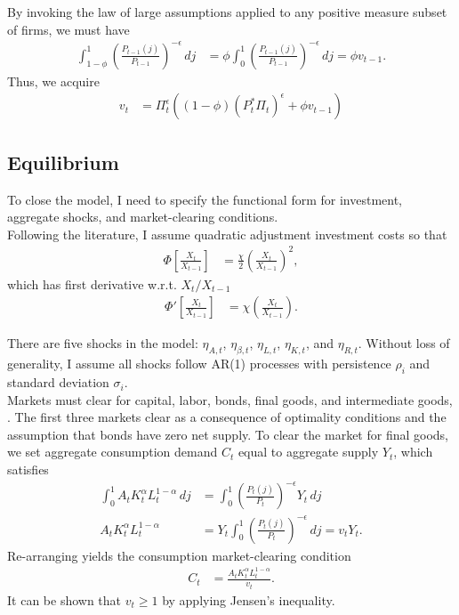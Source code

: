 \documentclass[12 pt, oneside]{article}
\theoremstyle{definition}
\theoremstyle{definition}
\theoremstyle{definition}
\begin{document}
By invoking the law of large assumptions applied to any positive measure subset of firms, we must have
\begin{align*}
  \int_{1 - \phi}^1 \left(\frac{P_{t - 1}(j)}{P_{t - 1}}\right)^{ - \epsilon}\,dj & = \phi\int_0^1 \left(\frac{P_{t - 1}(j)}{P_{t - 1}}\right)^{ - \epsilon}\,dj = \phi v_{t - 1}.
\end{align*}
Thus, we acquire
\begin{align}\label{eq:price dispersion evol}
  v_t & = \Pi_t^{\epsilon}((1 - \phi) (P_t^* \Pi_t)^{\epsilon} + \phi v_{t - 1})
\end{align}


\subsection{Equilibrium}
To close the model, I need to specify the functional form for investment, aggregate shocks, and market-clearing conditions.\\

Following the literature, I assume quadratic adjustment investment costs so that
\begin{align}\label{eq:invst adjst cost fnct}
  \Phi\left[\frac{X_t}{X_{t - 1}}\right] & = \frac{\chi}{2}\left(\frac{X_t}{X_{t - 1}}\right)^2,
\end{align}
which has first derivative w.r.t. $X_t / X_{t - 1}$
\begin{align}\label{eq:invst adjst cost fnct first deriv}
    \Phi'\left[\frac{X_t}{X_{t - 1}}\right] & = \chi\left(\frac{X_t}{X_{t - 1}}\right).
\end{align}

There are five shocks in the model: $\eta_{A, t}$, $\eta_{\beta, t}$, $\eta_{L, t}$, $\eta_{K, t}$, and $\eta_{R, t}$. Without loss of generality, I assume all shocks follow AR(1) processes with persistence $\rho_i$ and standard deviation $\sigma_i$.\\

Markets must clear for capital, labor, bonds, final goods, and intermediate goods, . The first three markets clear as a consequence of optimality conditions and the assumption that bonds have zero net supply. To clear the market for final goods, we set aggregate consumption demand $C_t$ equal to aggregate supply $Y_t$, which satisfies
\begin{align*}
\int_0^1 A_t K_t^\alpha L_t^{1 - \alpha}\, dj & = \int_0^1\left(\frac{P_t(j)}{P_t}\right)^{-\epsilon} Y_t\, dj\\
  A_tK_t^\alpha L_t^{1 - \alpha} & = Y_t \int_0^1\left(\frac{P_t(j)}{P_t}\right)^{-\epsilon} \, dj = v_t Y_t.
\end{align*}
Re-arranging yields the consumption market-clearing condition
\begin{align}\label{eq:consumption market clearing}
  C_t & = \frac{A_t K_t^{\alpha}L_t^{1 - \alpha}}{v_t}.
\end{align}
It can be shown that $v_t \geq 1$ by applying Jensen's inequality.
\end{document}
